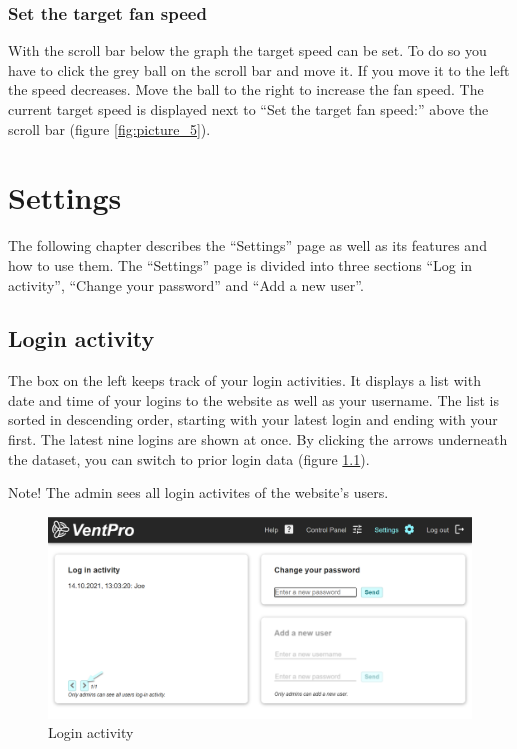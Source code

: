 \subsection*{Set the target fan speed}

With the scroll bar below the graph the target speed can be set. To do so you have to click the grey ball on the scroll bar and move it. If you move it to the left the speed decreases. Move the ball to the right to increase the fan speed. The current target speed is displayed next to “Set the target fan speed:” above the scroll bar (figure \ref{fig:picture_5}).



\chapter{Settings}
\label{sec:settings}

The following chapter describes the “Settings” page as well as its features and how to use them. The “Settings” page is divided into three sections “Log in activity”, “Change your password” and “Add a new user”.



\section{Login activity}
\label{sec:login_activity}

The box on the left keeps track of your login activities. It displays a list with date and time of your logins to the website as well as your username. The list is sorted in descending order, starting with your latest login and ending with your first. The latest nine logins are shown at once. By clicking the arrows underneath the dataset, you can switch to prior login data (figure \ref{fig:picture_6}). 

\color{red}
Note! The admin sees all login activites of the website’s users.
\color{black}

\vspace{0.5cm}
\begin{figure}[h]
\centering
\includegraphics[width=1.0\textwidth]{img/Picture6}
\caption{Login activity}
\label{fig:picture_6}
\end{figure}


